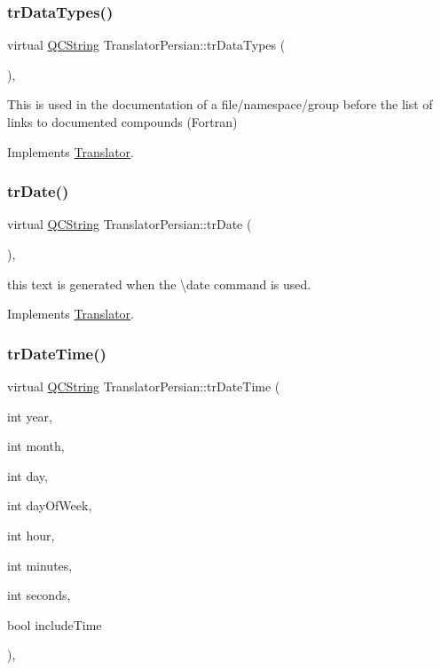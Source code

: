 \subsubsection{\texorpdfstring{trDataTypes()}{trDataTypes()}}
{\footnotesize\ttfamily virtual \mbox{\hyperlink{class_q_c_string}{Q\+C\+String}} Translator\+Persian\+::tr\+Data\+Types (\begin{DoxyParamCaption}{ }\end{DoxyParamCaption})\hspace{0.3cm}{\ttfamily [inline]}, {\ttfamily [virtual]}}

This is used in the documentation of a file/namespace/group before the list of links to documented compounds (Fortran) 

Implements \mbox{\hyperlink{class_translator}{Translator}}.

\mbox{\label{class_translator_persian_a727c1b9a7df46be6a98c15eae1013a28}} 
\subsubsection{\texorpdfstring{trDate()}{trDate()}}
{\footnotesize\ttfamily virtual \mbox{\hyperlink{class_q_c_string}{Q\+C\+String}} Translator\+Persian\+::tr\+Date (\begin{DoxyParamCaption}{ }\end{DoxyParamCaption})\hspace{0.3cm}{\ttfamily [inline]}, {\ttfamily [virtual]}}

this text is generated when the \textbackslash{}date command is used. 

Implements \mbox{\hyperlink{class_translator}{Translator}}.

\mbox{\label{class_translator_persian_ac226f015b06ad5461d33f2faaabb8143}} 
\subsubsection{\texorpdfstring{trDateTime()}{trDateTime()}}
{\footnotesize\ttfamily virtual \mbox{\hyperlink{class_q_c_string}{Q\+C\+String}} Translator\+Persian\+::tr\+Date\+Time (\begin{DoxyParamCaption}\item[{int}]{year,  }\item[{int}]{month,  }\item[{int}]{day,  }\item[{int}]{day\+Of\+Week,  }\item[{int}]{hour,  }\item[{int}]{minutes,  }\item[{int}]{seconds,  }\item[{bool}]{include\+Time }\end{DoxyParamCaption})\hspace{0.3cm}{\ttfamily [inline]}, {\ttfamily [virtual]}}

